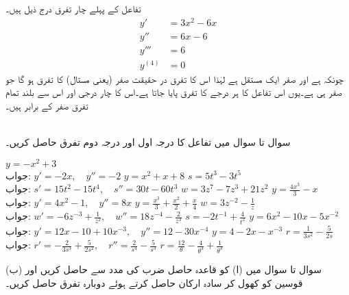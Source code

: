 تفاعل  کے پہلے چار تفرق درج ذیل ہیں۔
\begin{align*}
y'&=3x^2-6x\\
y''&=6x-6\\
y'''&=6\\
y^{(4)}&=0
\end{align*}
چونکہ  ہے اور صفر ایک مستقل ہے لہٰذا اس کا تفرق در حقیقت صفر (یعنی مستال) کا تفرق ہو گا جو صفر ہی ہے۔یوں اس تفاعل کا ہر درجے کا تفرق پایا جاتا ہے۔اس کا چار درجی اور اس سے بلند تمام تفرق صفر کے برابر ہیں۔

\\
سوال  تا سوال  میں تفاعل کا درجہ اول اور درجہ دوم تفرق حاصل کریں۔

$y=-x^2+3$\\
جواب:\quad
$y'=-2x,\quad y''=-2$
$y=x^2+x+8$
$s=5t^3-3t^5$\\
جواب:\quad
$s'=15t^2-15t^4,\quad s''=30t-60t^3$
$w=3z^7-7z^3+21z^2$
$y=\tfrac{4x^3}{3}-x$\\
جواب:\quad
$y'=4x^2-1,\quad y''=8x$
$y=\tfrac{x^3}{3}+\tfrac{x^2}{2}+\tfrac{x}{4}$
$w=3z^{-2}-\tfrac{1}{z}$\\
جواب:\quad
$w'=-6z^{-3}+\tfrac{1}{z^2},\quad w''=18z^{-4}-\tfrac{2}{z^3}$
$s=-2t^{-1}+\tfrac{4}{t^2}$
$y=6x^2-10x-5x^{-2}$\\
جواب:\quad
$y'=12x-10+10x^{-3},\quad y''=12-30x^{-4}$
$y=4-2x-x^{-3}$
$r=\tfrac{1}{3s^2}-\tfrac{5}{2s}$\\
جواب:\quad
$r'=-\tfrac{2}{3s^3}+\tfrac{5}{2s^2},\quad r''=\tfrac{2}{s^4}-\tfrac{5}{s^3}$
$r=\tfrac{12}{\theta}-\tfrac{4}{\theta^3}+\tfrac{1}{\theta^4}$

سوال  تا سوال  میں (ا)  کو قاعدہ حاصل ضرب کی مدد سے حاصل کریں اور (ب) قوسین کو کھول کر سادہ ارکان حاصل کرتے ہوئے دوبارہ تفرق حاصل کریں۔

